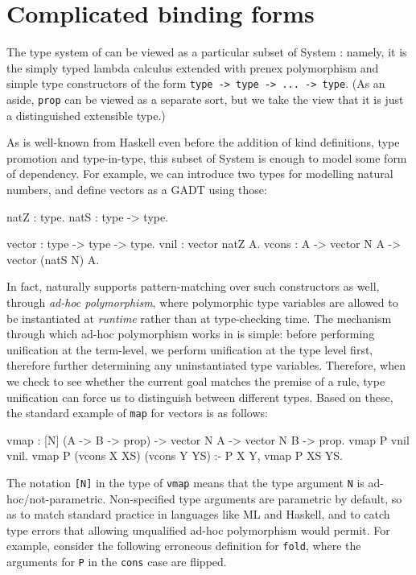 \documentclass[format=acmlarge,review,anonymous]{acmart}\settopmatter{printfolios=true}
\begin{document}

\section{Complicated binding forms}

The type system of \lamprolog can be viewed as a particular subset of System \fomega: namely, it is the
simply typed lambda calculus extended with prenex polymorphism and simple type constructors of the
form \texttt{type -> type -> ... -> type}. (As an aside, \texttt{prop} can be viewed as a separate
sort, but we take the view that it is just a distinguished extensible type.)

As is well-known from Haskell even before the addition of kind definitions, type promotion and
type-in-type, this subset of System \fomega is enough to model some form of dependency. For example, we
can introduce two types for modelling natural numbers, and define vectors as a GADT using those:

\begin{codequote}
natZ : type.
natS : type -> type.

vector : type -> type -> type.
vnil : vector natZ A.
vcons : A -> vector N A -> vector (natS N) A.
\end{codequote}

In fact, \lamprolog naturally supports pattern-matching over such constructors as well, through
\emph{ad-hoc polymorphism}, where polymorphic type variables are allowed to be instantiated at
\emph{runtime} rather than at type-checking time. The mechanism through which ad-hoc polymorphism
works in \lamprolog is simple: before performing unification at the term-level, we perform unification
at the type level first, therefore further determining any uninstantiated type variables.
Therefore, when we check to see whether the current goal matches the premise of a rule, type
unification can force us to distinguish between different types. Based on these, the standard
example of \texttt{map} for vectors is as follows:

\begin{codequote}
vmap : [N] (A -> B -> prop) -> vector N A -> vector N B -> prop.
vmap P vnil vnil.
vmap P (vcons X XS) (vcons Y YS) :- P X Y, vmap P XS YS.
\end{codequote}

The notation \texttt{{[}N{]}} in the type of \texttt{vmap} means that the type argument \texttt{N}
is ad-hoc/not-parametric. Non-specified type arguments are parametric by default, so as to match
standard practice in languages like ML and Haskell, and to catch type errors that allowing
unqualified ad-hoc polymorphism would permit. For example, consider the following erroneous
definition for \texttt{fold}, where the arguments for \texttt{P} in the \texttt{cons} case are
flipped.
\end{document}
